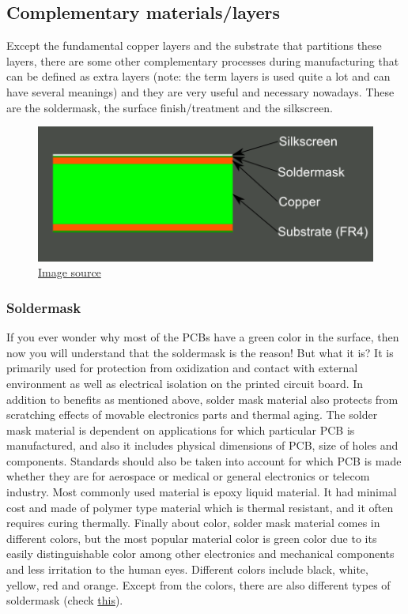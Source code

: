 \documentclass[final]{cubedoc}
\begin{document}
	\subsection{Complementary materials/layers}
	\label{subsec:complementary}
	
	Except the fundamental copper layers and the substrate that partitions these layers, there are some other complementary processes during manufacturing that can be defined as extra layers (note: the term layers is used quite a lot and can have several meanings) and they are very useful and necessary nowadays. These are the soldermask, the surface finish/treatment and the silkscreen.
	
	
	\begin{figure}[h!]
		\centering
		\includegraphics{assets/2_layer_plus_silkscreen.png}
		\caption{\href{https://learn.sparkfun.com/tutorials/using-eagle-board-layout/all}{Image source}}
		\label{fig:my_label}
	\end{figure}
	
	\subsubsection{Soldermask}
	
	If you ever wonder why most of the PCBs have a green color in the surface, then now you will understand that the soldermask is the reason! But what it is?
	It is primarily used for protection from oxidization and contact with external environment as well as electrical isolation on the printed circuit board. In addition to benefits as mentioned above, solder mask material also protects from scratching effects of movable electronics parts and thermal aging. The solder mask material is dependent on applications for which particular PCB is manufactured, and also it includes physical dimensions of PCB, size of holes and components. Standards should also be taken into account for which PCB is made whether they are for aerospace or medical or general electronics or telecom industry. Most commonly used material is epoxy liquid material. It had minimal cost and made of polymer type material which is thermal resistant, and it often requires curing thermally. Finally about color, solder mask material comes in different colors, but the most popular material color is green color due to its easily distinguishable color among other electronics and mechanical components and less irritation to the human eyes. Different colors include black, white, yellow, red and orange. Except from the colors, there are also different types of soldermask (check \href{https://www.allpcb.com/soldermask/soldermask_types.html}{this}).
	
\end{document}
